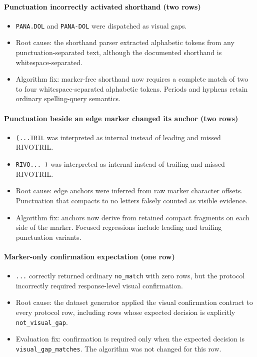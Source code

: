 \paragraph{Punctuation incorrectly activated shorthand (two rows)}\label{punctuation-incorrectly-activated-shorthand-two-rows}

\begin{itemize}
\tightlist
\item
  \texttt{PANA.DOL} and \texttt{PANA-DOL} were dispatched as visual gaps.
\item
  Root cause: the shorthand parser extracted alphabetic tokens from any
  punctuation-separated text, although the documented shorthand is
  whitespace-separated.
\item
  Algorithm fix: marker-free shorthand now requires a complete match of two to
  four whitespace-separated alphabetic tokens. Periods and hyphens retain
  ordinary spelling-query semantics.
\end{itemize}

\paragraph{Punctuation beside an edge marker changed its anchor (two rows)}\label{punctuation-beside-an-edge-marker-changed-its-anchor-two-rows}

\begin{itemize}
\tightlist
\item
  \texttt{(...TRIL} was interpreted as internal instead of leading and missed
  RIVOTRIL.
\item
  \texttt{RIVO...\ )} was interpreted as internal instead of trailing and missed
  RIVOTRIL.
\item
  Root cause: edge anchors were inferred from raw marker character offsets.
  Punctuation that compacts to no letters falsely counted as visible evidence.
\item
  Algorithm fix: anchors now derive from retained compact fragments on each
  side of the marker. Focused regressions include leading and trailing
  punctuation variants.
\end{itemize}

\paragraph{Marker-only confirmation expectation (one row)}\label{marker-only-confirmation-expectation-one-row}

\begin{itemize}
\tightlist
\item
  \texttt{...} correctly returned ordinary \texttt{no\_match} with zero rows, but the protocol
  incorrectly required response-level visual confirmation.
\item
  Root cause: the dataset generator applied the visual confirmation contract to
  every protocol row, including rows whose expected decision is explicitly
  \texttt{not\_visual\_gap}.
\item
  Evaluation fix: confirmation is required only when the expected decision is
  \texttt{visual\_gap\_matches}. The algorithm was not changed for this row.
\end{itemize}

